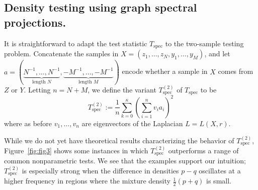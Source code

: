 \documentclass{article}
\newcommand{\1}{\mathbf{1}}
\theoremstyle{alden}
\theoremstyle{aldenthm}
\theoremstyle{definition}
\theoremstyle{remark}
\begin{document}
\subsection{Density testing using graph spectral projections.}
\label{subsec:spectral_density_testing}

It is straightforward to adapt the test statistic $T_{\mathrm{spec}}$ to the two-sample testing problem. Concatenate the samples in $X = (z_1,\ldots,z_N,y_1,\ldots,y_M)$, and let $a = (\underbrace{N^{-1},\ldots,{N^{-1}}}_{\textrm{length } N},\underbrace{-M^{-1},\ldots,-M^{-1}}_{\textrm{length } M})$ encode whether a sample in $X$ comes from $Z$ or $Y$. Letting $n = N + M$, we define the variant $T_{\mathrm{spec}}^{(2)}$ of $T_{\mathrm{spec}}$ to be
\begin{equation}
\label{eqn:graph_spectral_projections_2}
T_{\mathrm{spec}}^{(2)} := \frac{1}{n} \sum_{k = 0}^{\kappa} \left(\sum_{i = 1}^{n} v_i a_i\right)^2
\end{equation}
where as before $v_1,\ldots,v_n$ are eigenvectors of the Laplacian $L = L(X,r)$.

While we do not yet have theoretical results characterizing the behavior of $T_{\mathrm{spec}}^{(2)}$, Figure~\ref{fig:fig3} shows some instances in which $T_{\mathrm{spec}}^{(2)}$ outperforms a range of common nonparametric tests. We see that the examples support our intuition; $T_{\textrm{spec}}^{(2)}$ is especially strong when the difference in densities $p - q$ oscillates at a higher frequency in regions where the mixture density $\frac{1}{2}(p + q)$ is small.
\end{document}
